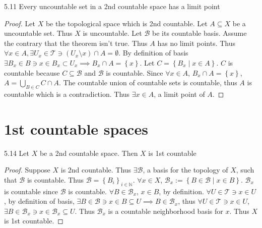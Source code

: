 \documentclass{article}
\newcommand*{\T}{\mathcal{T}}
\newcommand*{\B}{\mathcal{B}}
\newcommand*{\subeq}{\subseteq}
\newcommand{\N}{\mathbb{N}}
\begin{document}
\bigskip

\begin{claim}{5.11}\label{Claim 5.11.}
    Every uncountable set in a 2nd countable space has a limit point 
\end{claim}
\begin{proof}
    Let $X$ be the topological space which is 2nd countable. Let $A \subseteq X$ be a uncountable set. Thus $X$ is uncountable. Let $\B$ be its countable basis.    
    Assume the contrary that the theorem isn't true. Thus $A$ has no limit points. Thus $\forall x \in A, \exists U_x \in \T \ni \left(U_x \setminus x\right) \cap A = \emptyset$. By definition of basis $\exists B_x \in B \ni x \in B_x \subset U_x \implies B_x \cap A = \left\{ x \right\}$. Let $C = \left\{ B_x  \mid x \in A \right\}$. $C$ is countable because $C \subseteq \B$ and $\B$ is countable. Since $\forall x \in A$, $B_x \cap A = \left\{ x \right\}$, $A = \bigcup_{B \in C} C \cap A$. The countable union of countable sets is countable, thus $A$ is countable which is a contradiction. Thus $\exists x \in A$, a limit point of $A$.                  
\end{proof}

\pagebreak

\section{1st countable spaces}
\begin{claim}{5.14}\label{Claim 5.14.}
    Let $X$ be a 2nd countable space. Then $X$ is 1st countable  
\end{claim}
\begin{proof}
    Suppose $X$ is 2nd countable. Thus $\exists \B$, a basis for the topology of $X$, such that $\B$ is countable. Thus $\B = \left\{ B_i \right\}_{i \in \N}$. $\forall x \in X$, $\B_x := \left\{ B \in \B \mid x \in B \right\}$. $\B_x$ is countable since $\B$ is countable. $\forall B \in \B_x$, $x \in B$, by definition. $\forall U \in \T \ni x \in U$, by definition of basis, $\exists B \in \B \ni x \in B \subeq U \implies B \in \B_x$, thus $\forall U \in \T \ni x \in U$, $\exists B \in \B_x \ni x \in \B_x \subeq U$. Thus $\B_x$ is a countable neighborhood basis for $x$. Thus $X$ is 1st countable.                    
\end{proof}

\bigskip
\end{document}
